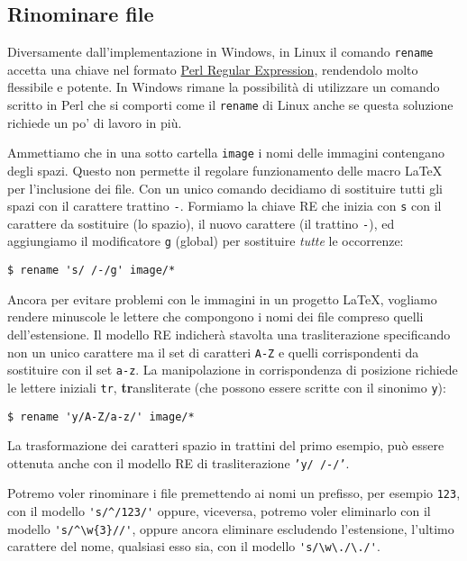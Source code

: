 \subsection{Rinominare file}

Diversamente dall'implementazione in Windows, in Linux il comando
\texttt{rename} accetta una chiave nel formato
\href{http://perldoc.perl.org/perlrequick.html}{Perl Regular Expression},
rendendolo molto flessibile e potente. In Windows rimane la possibilità di
utilizzare un comando scritto in Perl che si comporti come il \texttt{rename} di
Linux anche se questa soluzione richiede un po' di lavoro in più.

Ammettiamo che in una sotto cartella \texttt{image} i nomi delle immagini
contengano degli spazi. Questo non permette il regolare funzionamento delle
macro \LaTeX{} per l'inclusione dei file. Con un unico comando decidiamo di
sostituire tutti gli spazi con il carattere trattino \texttt{-}. Formiamo la
chiave RE che inizia con \texttt{s} con il carattere da sostituire (lo spazio),
il nuovo carattere (il trattino \texttt{-}), ed aggiungiamo il modificatore
\texttt{g} (global) per sostituire \emph{tutte} le occorrenze:
\begin{verbatim}
$ rename 's/ /-/g' image/*
\end{verbatim}

Ancora per evitare problemi con le immagini in un progetto \LaTeX, vogliamo
rendere minuscole le lettere che compongono i nomi dei file compreso quelli
dell'estensione. Il modello RE indicherà stavolta una trasliterazione
specificando non un unico carattere ma il set di caratteri \texttt{A-Z} e quelli
corrispondenti da sostituire con il set \texttt{a-z}. La manipolazione in
corrispondenza di posizione richiede le lettere iniziali \texttt{tr},
\textbf{tr}ansliterate (che possono essere scritte con il sinonimo \texttt{y}):
\begin{verbatim}
$ rename 'y/A-Z/a-z/' image/*
\end{verbatim}

La trasformazione dei caratteri spazio in trattini del primo esempio, può essere
ottenuta anche con il modello RE di trasliterazione \texttt{'y/ /-/'}.

Potremo voler rinominare i file premettendo ai nomi un prefisso, per esempio
\texttt{123}, con il modello \verb='s/^/123/'= oppure, viceversa, potremo voler
eliminarlo con il modello \verb='s/^\w{3}//'=, oppure ancora eliminare
escludendo l'estensione, l'ultimo carattere del nome, qualsiasi esso sia, con il
modello \verb='s/\w\./\./'=.


